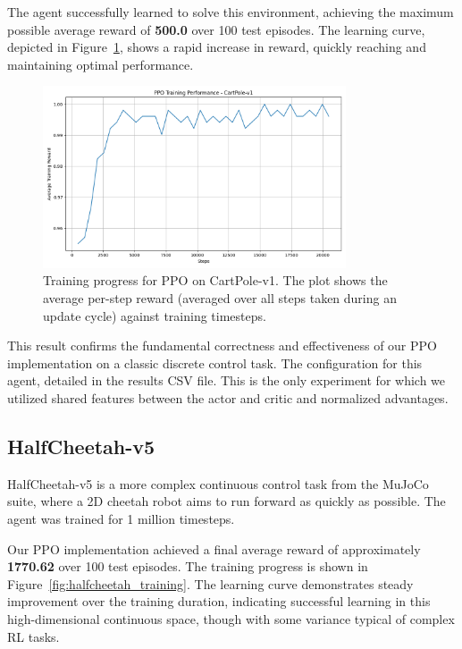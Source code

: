 The agent successfully learned to solve this environment, achieving the maximum possible average reward of \textbf{500.0} over 100 test episodes. The learning curve, depicted in Figure~\ref{fig:cartpole_training}, shows a rapid increase in reward, quickly reaching and maintaining optimal performance.

\begin{figure}[H]
    \centering
    \includegraphics[width=0.8\textwidth]{figures/cartpole_training_plot.png}
    \caption{Training progress for PPO on CartPole-v1. The plot shows the average per-step reward (averaged over all steps taken during an update cycle) against training timesteps.}
    \label{fig:cartpole_training}
\end{figure}

This result confirms the fundamental correctness and effectiveness of our PPO implementation on a classic discrete control task. The configuration for this agent, detailed in the results CSV file. This is the only experiment for which we utilized shared features between the actor and critic and normalized advantages.

\subsection{HalfCheetah-v5}
HalfCheetah-v5 is a more complex continuous control task from the MuJoCo suite, where a 2D cheetah robot aims to run forward as quickly as possible. The agent was trained for 1 million timesteps.

Our PPO implementation achieved a final average reward of approximately \textbf{1770.62} over 100 test episodes. The training progress is shown in Figure~\ref{fig:halfcheetah_training}. The learning curve demonstrates steady improvement over the training duration, indicating successful learning in this high-dimensional continuous space, though with some variance typical of complex RL tasks.

